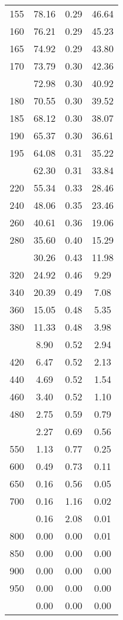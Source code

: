 \begin{table}[ht]
\begin{tabular}{lccc}
  155 & 78.16 & 0.29 & 46.64 \\ 
  160 & 76.21 & 0.29 & 45.23 \\ 
  165 & 74.92 & 0.29 & 43.80 \\ 
  170 & 73.79 & 0.30 & 42.36 \\ 
   \addlinespace
175 & 72.98 & 0.30 & 40.92 \\ 
  180 & 70.55 & 0.30 & 39.52 \\ 
  185 & 68.12 & 0.30 & 38.07 \\ 
  190 & 65.37 & 0.30 & 36.61 \\ 
  195 & 64.08 & 0.31 & 35.22 \\ 
   \addlinespace
200 & 62.30 & 0.31 & 33.84 \\ 
  220 & 55.34 & 0.33 & 28.46 \\ 
  240 & 48.06 & 0.35 & 23.46 \\ 
  260 & 40.61 & 0.36 & 19.06 \\ 
  280 & 35.60 & 0.40 & 15.29 \\ 
   \addlinespace
300 & 30.26 & 0.43 & 11.98 \\ 
  320 & 24.92 & 0.46 & 9.29 \\ 
  340 & 20.39 & 0.49 & 7.08 \\ 
  360 & 15.05 & 0.48 & 5.35 \\ 
  380 & 11.33 & 0.48 & 3.98 \\ 
   \addlinespace
400 & 8.90 & 0.52 & 2.94 \\ 
  420 & 6.47 & 0.52 & 2.13 \\ 
  440 & 4.69 & 0.52 & 1.54 \\ 
  460 & 3.40 & 0.52 & 1.10 \\ 
  480 & 2.75 & 0.59 & 0.79 \\ 
   \addlinespace
500 & 2.27 & 0.69 & 0.56 \\ 
  550 & 1.13 & 0.77 & 0.25 \\ 
  600 & 0.49 & 0.73 & 0.11 \\ 
  650 & 0.16 & 0.56 & 0.05 \\ 
  700 & 0.16 & 1.16 & 0.02 \\ 
   \addlinespace
750 & 0.16 & 2.08 & 0.01 \\ 
  800 & 0.00 & 0.00 & 0.01 \\ 
  850 & 0.00 & 0.00 & 0.00 \\ 
  900 & 0.00 & 0.00 & 0.00 \\ 
  950 & 0.00 & 0.00 & 0.00 \\ 
   \addlinespace
1000 & 0.00 & 0.00 & 0.00 \\ 
   \bottomrule
\end{tabular}
\end{table}
